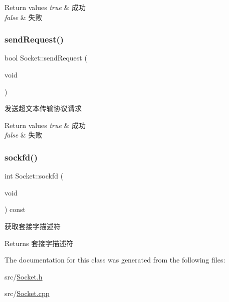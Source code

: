 \begin{DoxyRetVals}{Return values}
{\em true} & 成功 \\
\hline
{\em false} & 失败 \\
\hline
\end{DoxyRetVals}
\mbox{\label{class_socket_acfc00252e4e40f68442a4b28fc5b32b3}} 
\subsubsection{\texorpdfstring{send\+Request()}{sendRequest()}}
{\footnotesize\ttfamily bool Socket\+::send\+Request (\begin{DoxyParamCaption}\item[{void}]{ }\end{DoxyParamCaption})}



发送超文本传输协议请求 


\begin{DoxyRetVals}{Return values}
{\em true} & 成功 \\
\hline
{\em false} & 失败 \\
\hline
\end{DoxyRetVals}
\mbox{\label{class_socket_a427f1295ef1fce2c69e0b9a093fd0284}} 
\subsubsection{\texorpdfstring{sockfd()}{sockfd()}}
{\footnotesize\ttfamily int Socket\+::sockfd (\begin{DoxyParamCaption}\item[{void}]{ }\end{DoxyParamCaption}) const}



获取套接字描述符 

\begin{DoxyReturn}{Returns}
套接字描述符 
\end{DoxyReturn}


The documentation for this class was generated from the following files\+:\begin{DoxyCompactItemize}
\item 
src/\hyperlink{_socket_8h}{Socket.\+h}\item 
src/\hyperlink{_socket_8cpp}{Socket.\+cpp}\end{DoxyCompactItemize}
